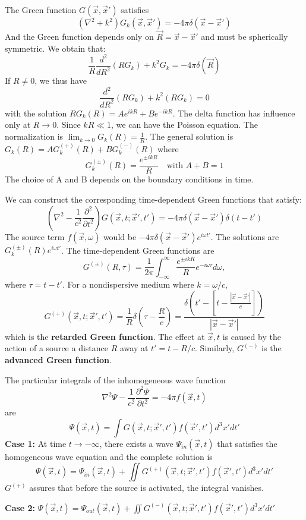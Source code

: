 \documentclass{article}
\begin{document}
	The Green function $G(\vec{x}, \vec{x}')$ satisfies
	$$ (\nabla^2 + k^2) G_k(\vec{x}, \vec{x}') = -4\pi \delta(\vec{x}-\vec{x}') $$
	And the Green function depends only on $\vec{R} = \vec{x} - \vec{x}'$ and must be spherically symmetric.
	We obtain that:
	$$ \frac{1}{R} \frac{d^2}{dR^2} (R G_k) + k^2 G_k = -4\pi \delta(\vec{R}) $$
	If $R \neq 0$, we thus have
	$$ \frac{d^2}{dR^2}(R G_k) + k^2 (R G_k) = 0 $$
	with the solution $R G_k(R) = A e^{ikR} + B e^{-ikR}$.
	The delta function has influence only at $R \to 0$. Since $kR \ll 1$, we can have the Poisson equation. The normalization is $\lim_{k \to 0} G_k(R) = \frac{1}{R}$.
	The general solution is $G_k(R) = A G_k^{(+)}(R) + B G_k^{(-)}(R)$ where
	$$ G_k^{(\pm)}(R) = \frac{e^{\pm ikR}}{R} \quad \text{with } A+B=1 $$
	The choice of A and B depends on the boundary conditions in time.
	
	We can construct the corresponding time-dependent Green functions that satisfy:
	$$ (\nabla^2 - \frac{1}{c^2}\frac{\partial^2}{\partial t^2}) G(\vec{x},t; \vec{x}',t') = -4\pi \delta(\vec{x}-\vec{x}') \delta(t-t') $$
	The source term $f(\vec{x}, \omega)$ would be $-4\pi \delta(\vec{x}-\vec{x}') e^{i\omega t'}$.
	The solutions are $G_k^{(\pm)}(R) e^{i\omega t'}$.
	The time-dependent Green functions are
	$$ G^{(\pm)}(R, \tau) = \frac{1}{2\pi} \int_{-\infty}^{\infty} \frac{e^{\pm ikR}}{R} e^{-i\omega\tau} d\omega, $$
	where $\tau = t - t'$.
	For a nondispersive medium where $k = \omega/c$,
	$$ G^{(+)}(\vec{x},t; \vec{x}',t') = \frac{1}{R} \delta\left(\tau - \frac{R}{c}\right) = \frac{\delta\left(t' - \left[t - \frac{|\vec{x}-\vec{x}'|}{c}\right]\right)}{|\vec{x}-\vec{x}'|} $$
	which is the \textbf{retarded Green function}. The effect at $\vec{x}, t$ is caused by the action of a source a distance $R$ away at $t' = t - R/c$.
	Similarly, $G^{(-)}$ is the \textbf{advanced Green function}.
	
	The particular integrals of the inhomogeneous wave function
	$$ \nabla^2 \Psi - \frac{1}{c^2} \frac{\partial^2 \Psi}{\partial t^2} = -4\pi f(\vec{x}, t) $$
	are
	$$ \Psi(\vec{x}, t) = \int G(\vec{x},t; \vec{x}',t') f(\vec{x}', t') d^3x' dt' $$
	\textbf{Case 1:} At time $t \to -\infty$, there exists a wave $\Psi_{in}(\vec{x}, t)$ that satisfies the homogeneous wave equation and the complete solution is
	$$ \Psi(\vec{x}, t) = \Psi_{in}(\vec{x}, t) + \iint G^{(+)}(\vec{x},t; \vec{x}',t') f(\vec{x}', t') d^3x' dt' $$
	$G^{(+)}$ assures that before the source is activated, the integral vanishes.
	
	\textbf{Case 2:} $\Psi(\vec{x}, t) = \Psi_{out}(\vec{x}, t) + \iint G^{(-)}(\vec{x},t; \vec{x}',t') f(\vec{x}', t') d^3x' dt'$
	
\end{document}
